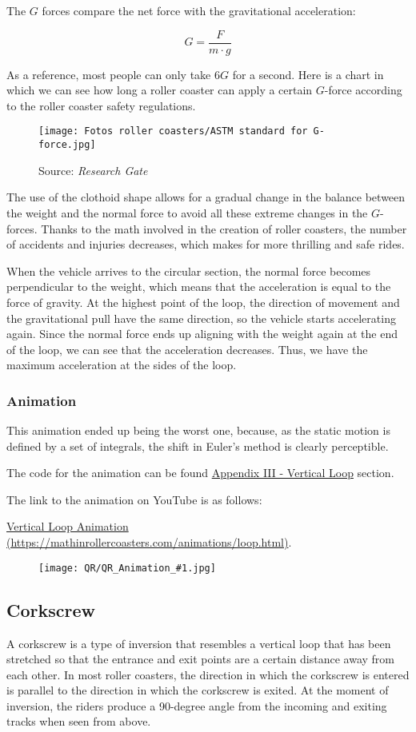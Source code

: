 \documentclass[12pt,twoside,a4paper]{article}
\newcommand{\ds}{\displaystyle}
\newcommand{\source}[1]{\caption*{Source: \textit{#1}} }
\newcommand{\link}[1]{https://mathinrollercoasters.com/animations/#1.html}
\newcommand{\LinkToAnimation}[2]{
\noindent The code for the animation can be found \hyperref[sec:Appendix III_#1]{Appendix III - #1} section.

\noindent The link to the animation on YouTube is as follows:
	
\noindent \href{\link{#2}}{#1 Animation (\link{#2})}.
	
\begin{figure}[H]
	\centering
	\texttt{[image: QR/QR\_Animation\_\#1.jpg]}
\end{figure}
}
\begin{document}
	The $G$ forces compare the net force with the gravitational acceleration:
	
	$$\ds G = \frac{F}{m \cdot g}$$
	
	As a reference, most people can only take $6 G$ for a second. Here is a chart in which we can see how long a roller coaster can apply a certain $G$-force according to the roller coaster safety regulations.
	
	\begin{figure}[H]
		\centering
		\texttt{[image: Fotos roller coasters/ASTM standard for G-force.jpg]}
		\caption{ASTM standards for G-force}
		\label{fig:astm-standard-for-g-force}
		\source{Research Gate}
	\end{figure}
	
	The use of the clothoid shape allows for a gradual change in the balance between the weight and the normal force to avoid all these extreme changes in the $G$-forces. Thanks to the math involved in the creation of roller coasters, the number of accidents and injuries decreases, which makes for more thrilling and safe rides.
	
	When the vehicle arrives to the circular section, the normal force becomes perpendicular to the weight, which means that the acceleration is equal to the force of gravity. At the highest point of the loop, the direction of movement and the gravitational pull have the same direction, so the vehicle starts accelerating again. Since the normal force ends up aligning with the weight again at the end of the loop, we can see that the acceleration decreases. Thus, we have the maximum acceleration at the sides of the loop.
	
	\subsubsection{Animation}
	This animation ended up being the worst one, because, as the static motion is defined by a set of integrals, the shift in Euler's method is clearly perceptible.
	
	\LinkToAnimation{Vertical Loop}{loop}
	
	\cleardoublepage
	
	\subsection{Corkscrew}
	A corkscrew is a type of inversion that resembles a vertical loop that has been stretched so that the entrance and exit points are a certain distance away from each other. In most roller coasters, the direction in which the corkscrew is entered is parallel to the direction in which the corkscrew is exited. At the moment of inversion, the riders produce a 90-degree angle from the incoming and exiting tracks when seen from above.
	
\end{document}

